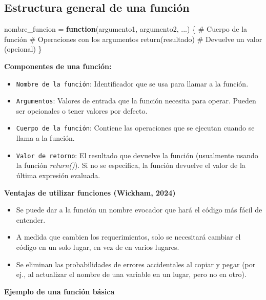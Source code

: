 \documentclass[
  spanish,
  letterpaper,
  DIV=11,
  numbers=noendperiod]{scrreprt}
\newenvironment{Shaded}{\begin{snugshade}}{\end{snugshade}}
\newcommand{\CommentTok}[1]{\textcolor[rgb]{0.37,0.37,0.37}{#1}}
\newcommand{\ControlFlowTok}[1]{\textcolor[rgb]{0.00,0.23,0.31}{\textbf{#1}}}
\newcommand{\FunctionTok}[1]{\textcolor[rgb]{0.28,0.35,0.67}{#1}}
\newcommand{\NormalTok}[1]{\textcolor[rgb]{0.00,0.23,0.31}{#1}}
\newcommand{\OtherTok}[1]{\textcolor[rgb]{0.00,0.23,0.31}{#1}}
\begin{document}
\subsection{Estructura general de una
función}\label{estructura-general-de-una-funciuxf3n}

\begin{Shaded}
\begin{Highlighting}[]
\NormalTok{nombre\_funcion }\OtherTok{=} \ControlFlowTok{function}\NormalTok{(argumento1, argumento2, ...) \{}
  \CommentTok{\# Cuerpo de la función}
  \CommentTok{\# Operaciones con los argumentos}
  \FunctionTok{return}\NormalTok{(resultado)  }\CommentTok{\# Devuelve un valor (opcional)}
\NormalTok{\}}
\end{Highlighting}
\end{Shaded}

\textbf{Componentes de una función:}

\begin{itemize}
\item
  \texttt{Nombre\ de\ la\ función}: Identificador que se usa para llamar
  a la función.
\item
  \texttt{Argumentos}: Valores de entrada que la función necesita para
  operar. Pueden ser opcionales o tener valores por defecto.
\item
  \texttt{Cuerpo\ de\ la\ función}: Contiene las operaciones que se
  ejecutan cuando se llama a la función.
\item
  \texttt{Valor\ de\ retorno}: El resultado que devuelve la función
  (usualmente usando la función \emph{return()}). Si no se especifica,
  la función devuelve el valor de la última expresión evaluada.
\end{itemize}

\textbf{Ventajas de utilizar funciones (Wickham, 2024)}

\begin{itemize}
\item
  Se puede dar a la función un nombre evocador que hará el código más
  fácil de entender.
\item
  A medida que cambien los requerimientos, solo se necesitará cambiar el
  código en un solo lugar, en vez de en varios lugares.
\item
  Se eliminan las probabilidades de errores accidentales al copiar y
  pegar (por ej., al actualizar el nombre de una variable en un lugar,
  pero no en otro).
\end{itemize}

\textbf{Ejemplo de una función básica}
\end{document}
